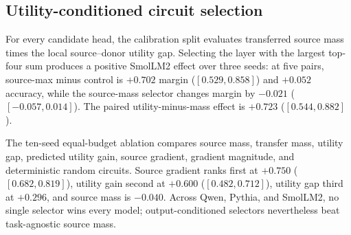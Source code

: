 \documentclass[letterpaper]{article} %
\begin{document}
\subsection{Utility-conditioned circuit selection}

For every candidate head, the calibration split evaluates transferred source mass times the local
source--donor utility gap. Selecting the layer with the largest top-four sum produces a positive SmolLM2 effect
over three seeds:
at five pairs, source-max minus control is $+0.702$ margin ($[0.529,0.858]$) and $+0.052$ accuracy, while the
source-mass selector changes margin by $-0.021$ ($[-0.057,0.014]$). The paired utility-minus-mass effect is
$+0.723$ ($[0.544,0.882]$).

The ten-seed equal-budget ablation compares source mass, transfer mass, utility gap, predicted utility gain,
source gradient, gradient magnitude, and deterministic random circuits. Source gradient ranks first at
$+0.750$ ($[0.682,0.819]$), utility gain second at $+0.600$ ($[0.482,0.712]$), utility gap third at
$+0.296$, and source mass is $-0.040$. Across Qwen, Pythia, and SmolLM2, no single selector wins every model;
output-conditioned selectors nevertheless beat task-agnostic source mass.
\end{document}
